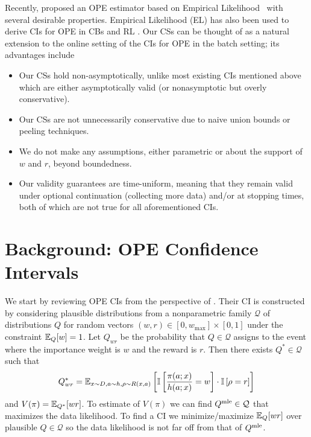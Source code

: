 Recently, \citet{kallus2019intrinsically} proposed an OPE estimator based on
Empirical Likelihood~\cite{owen2001empirical} with several desirable
properties. Empirical Likelihood (EL) has also been used to derive CIs for OPE
in CBs \cite{karampatziakis2019empirical} and RL \cite{dai2020coindice}. Our
CSs can be thought of as a natural extension to the online setting of the CIs
for OPE in the batch setting; its advantages include
\begin{itemize}
\item Our CSs hold non-asymptotically, unlike most existing CIs mentioned above which are either asymptotically valid (or nonasymptotic but overly conservative).
\item Our CSs are not unnecessarily conservative due to naive union bounds or peeling techniques.
\item We do not make any assumptions, either parametric 
or about the support of $w$ and $r$, beyond boundedness.
\item Our validity guarantees are time-uniform, meaning that they remain valid under optional continuation (collecting more data) and/or at stopping times, both of which are not true for all aforementioned CIs.
\end{itemize}

\section{Background: OPE Confidence Intervals}
We start by reviewing OPE CIs from the perspective of
\citet{karampatziakis2019empirical}. Their CI is constructed by considering
plausible distributions from a nonparametric family $\mathcal{Q}$ of
distributions  $Q$ for random vectors $(w,r) \in [0,w_{\max}]\times [0,1]$
under the constraint $\mathbb{E}_Q[w]=1$. Let $Q_{wr}$ be the probability that $Q \in
\mathcal{Q}$ assigns to the event where the importance weight is $w$ and the
reward is $r$. Then there exists $Q^* \in \mathcal{Q}$ such that
\[
Q^*_{wr}=\mathbb{E}_{x\sim D,a\sim h,\rho\sim R(x,a)}
\left[
\mathbb{I}\left[\frac{\pi(a;x)}{h(a;x)}=w\right]\cdot
\mathbb{I}\left[\rho=r\right]
\right]
\]
and 
$
V(\pi)=\mathbb{E}_{Q^*}[wr]
$.
To estimate of $V(\pi)$ we can find $Q^{\textrm{mle}} \in \mathcal{Q}$ that maximizes
the data likelihood. To find a CI we minimize/maximize $\mathbb{E}_Q[wr]$ over
plausible $Q \in \mathcal{Q}$ so the data likelihood is not far off from that
of $Q^{\textrm{mle}}$.


